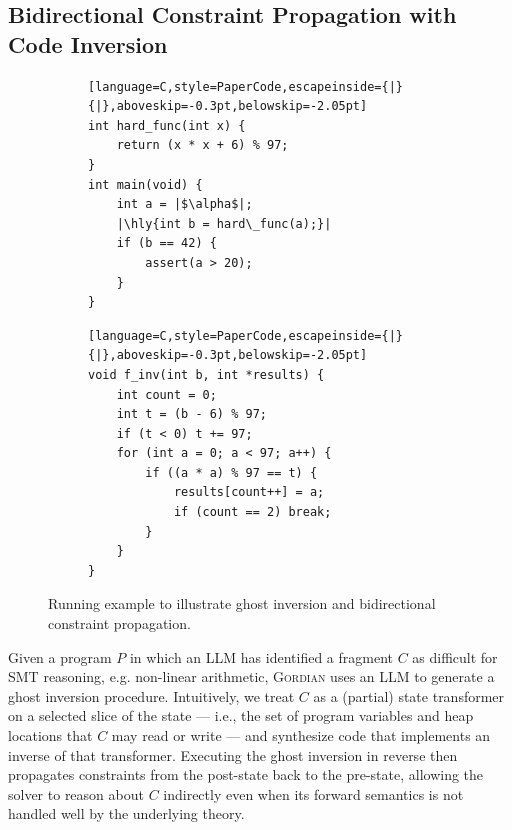 \documentclass[acmsmall]{acmart}
\newcommand{\gordianhighlight}[2]{%
  \begingroup
  \setlength{\fboxsep}{0pt}%
  \colorbox{#1}{\kern1pt\raisebox{0pt}[\dimexpr\height+2pt\relax][\dimexpr\depth+2pt\relax]{#2}\kern1pt}%
  \endgroup
}
\newcommand{\hly}[1]{\gordianhighlight{yellow!50}{#1}}
\newcommand{\projName}{\textsc{Gordian}\xspace}
\theoremstyle{definition}
\begin{document}
\subsection{Bidirectional Constraint Propagation with Code Inversion}
\label{sec:bidirectional}

\begin{figure}[t]
  \begin{subfigure}[b]{0.48\textwidth}
    \centering
{\scriptsize          
\begin{lstlisting}[language=C,style=PaperCode,escapeinside={|}{|},aboveskip=-0.3pt,belowskip=-2.05pt]
int hard_func(int x) { 
    return (x * x + 6) % 97; 
}
int main(void) {
    int a = |$\alpha$|;
    |\hly{int b = hard\_func(a);}|
    if (b == 42) {
        assert(a > 20);
    }
}
\end{lstlisting}
}
  \end{subfigure}
  \hfill
  \begin{subfigure}[b]{0.48\textwidth}
    \centering
{\scriptsize          
\begin{lstlisting}[language=C,style=PaperCode,escapeinside={|}{|},aboveskip=-0.3pt,belowskip=-2.05pt]
void f_inv(int b, int *results) {
    int count = 0;
    int t = (b - 6) % 97;
    if (t < 0) t += 97;
    for (int a = 0; a < 97; a++) {
        if ((a * a) % 97 == t) {
            results[count++] = a;
            if (count == 2) break;
        }
    }
}
\end{lstlisting}
}
  \end{subfigure}
  \vspace{-2mm}
  \caption{Running example to illustrate ghost inversion and bidirectional constraint propagation.\label{fig:inversion_running_example}} 
  \vspace{-2mm} 
\end{figure}


Given a program $P$ in which an LLM has identified a fragment $C$ as difficult for SMT reasoning, e.g. non-linear arithmetic, \projName uses an LLM to generate a ghost inversion procedure. Intuitively, we treat $C$ as a (partial) state transformer on a selected slice of the state --- i.e., the set of program variables and heap locations that $C$ may read or write --- and synthesize code that implements an inverse of that transformer. Executing the ghost inversion in reverse then propagates constraints from the post-state back to the pre-state, allowing the solver to reason about $C$ indirectly even when its forward semantics is not handled well by the underlying theory.
\end{document}
